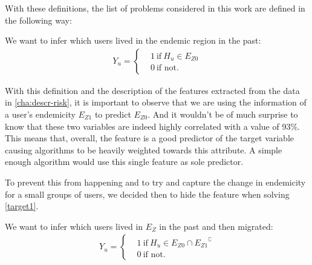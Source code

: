 With these definitions, the list of problems considered in this work are defined in the following way:

\begin{problem}\label{target1}
We want to infer which users lived in the endemic region in the past:
		\begin{align*}
		Y_u =
		\begin{cases}
		&1 \ \mbox{if} \ H_u \in E_{Z0} \\
		&0 \ \mbox{if not}.
		\end{cases}
		\end{align*}
\end{problem}

With this definition and the description of the features extracted from the data in \cref{cha:descr-risk}, it is important to observe that we are using the information of a user's endemicity $E_{Z1}$ to predict $E_{Z0}$.
And it wouldn't be of much surprise to know that these two variables are indeed highly correlated with a value of 93\%. This means that, overall, the feature is a good predictor of the target variable causing algorithms to be heavily weighted towards this attribute. A simple enough algorithm would use this single feature as sole predictor.

To prevent this from happening and to try and capture the change in endemicity for a small groups of users, we decided then to hide the feature when solving \cref{target1}.



\begin{problem}\label{target2}
We want to infer which users lived in $E_Z$ in the past and then migrated:\label{itm:target2}
	\begin{align*}
				Y_u =
				\begin{cases}
					&1 \ \mbox{if} \ H_u \in E_{Z0} \cap { E_{Z1} }^{\complement}  \\
					&0 \ \mbox{if not}.
				\end{cases}
			\end{align*}
\end{problem}

